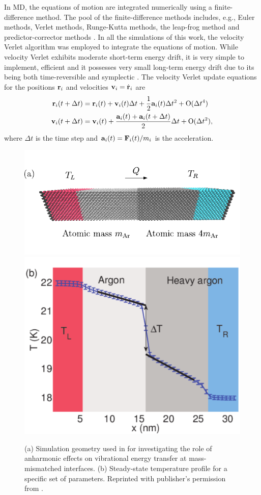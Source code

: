 In MD, the equations of motion are integrated numerically using a finite-difference method. The pool of the finite-difference methods includes, e.g., Euler methods, Verlet methods, Runge-Kutta methods, the leap-frog method and predictor-corrector methods \cite{allentildesley}. In all the simulations of this work, the velocity Verlet algorithm was employed to integrate the equations of motion. While velocity Verlet exhibits moderate short-term energy drift, it is very simple to implement, efficient and it possesses very small long-term energy drift due to its being both time-reversible and symplectic \cite{frenkelsmit}. The velocity Verlet update equations for the positions $\mathbf{r}_i$ and velocities $\mathbf{v}_i=\dot{\mathbf{r}}_i$ are \cite{allentildesley}
\begin{alignat}{2}
  \mathbf{r}_i(t+\Delta t) &= \mathbf{r}_i(t) + \mathbf{v}_i(t)\Delta t+  \frac{1}{2}\mathbf{a}_i(t) \Delta t^2 + \mathrm{O}(\Delta t^4) \\
  \mathbf{v}_i(t+\Delta t) &= \mathbf{v}_i(t) + \frac{ \mathbf{a}_i(t)+\mathbf{a}_i(t+\Delta t)}{2} \Delta t+ \mathrm{O}(\Delta t^2) ,
\end{alignat}
where $\Delta t$ is the time step and $\mathbf{a}_i(t)=\mathbf{F}_i(t)/m_i$ is the acceleration.

\begin{figure}[tb]
 \begin{center}
  \includegraphics[width=.59\columnwidth]{pics/nemd_fig2a_2.pdf} 
  \includegraphics[width=.59\columnwidth]{pics/nemd_fig2b_2.pdf}
  \caption{(a) Simulation geometry used in  for investigating the role of anharmonic effects on vibrational energy transfer at mass-mismatched interfaces. (b) Steady-state temperature profile for a specific set of parameters. Reprinted with publisher's permission from .}  
\label{fig:th_spectral_geom}
 \end{center}
\end{figure}

